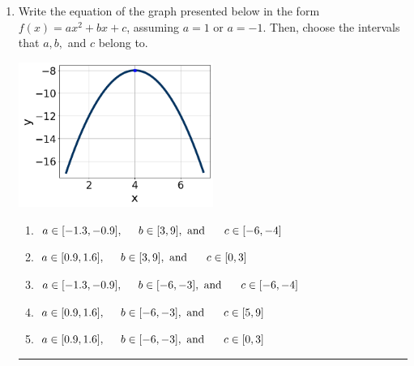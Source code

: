 \documentclass[14pt]{extbook}
\newcommand{\litem}[1]{\item#1\hspace*{-1cm}\rule{\textwidth}{0.4pt}}
\begin{document}
\begin{enumerate}
\litem{
Write the equation of the graph presented below in the form $f(x)=ax^2+bx+c$, assuming  $a=1$ or $a=-1$. Then, choose the intervals that $a, b,$ and $c$ belong to.
\begin{center}
    \includegraphics[width=0.5\textwidth]{../Figures/quadraticGraphToEquationCopyA.png}
\end{center}
\begin{enumerate}[label=\Alph*.]
\item \( a \in [-1.3, -0.9], \hspace*{5mm} b \in [3, 9], \text{ and } \hspace*{5mm} c \in [-6, -4] \)
\item \( a \in [0.9, 1.6], \hspace*{5mm} b \in [3, 9], \text{ and } \hspace*{5mm} c \in [0, 3] \)
\item \( a \in [-1.3, -0.9], \hspace*{5mm} b \in [-6, -3], \text{ and } \hspace*{5mm} c \in [-6, -4] \)
\item \( a \in [0.9, 1.6], \hspace*{5mm} b \in [-6, -3], \text{ and } \hspace*{5mm} c \in [5, 9] \)
\item \( a \in [0.9, 1.6], \hspace*{5mm} b \in [-6, -3], \text{ and } \hspace*{5mm} c \in [0, 3] \)


\end{enumerate}}
\end{enumerate}
\end{document}
